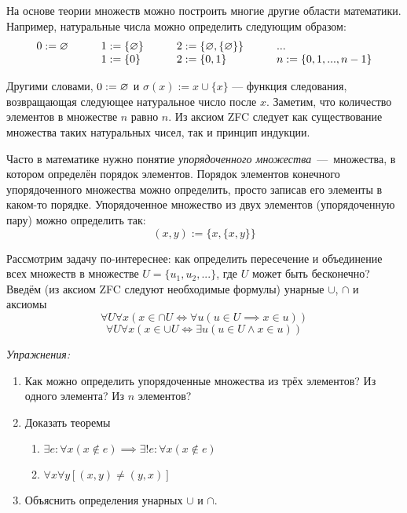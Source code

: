 На основе теории множеств можно построить многие другие области математики.
Например, натуральные числа можно определить следующим образом:
\[ \begin{array}{llll}
		0 :=\varnothing\qquad & 1  :=\{\varnothing\}\qquad & 2  :=\{\varnothing,\{\varnothing\}\}\qquad & ... \\
		                & 1:=\{0\}\qquad       & 2:=\{0,1\}
		                & n:=\{0,1,...,n-1\}
	\end{array}
\]

Другими словами, ${0:=\varnothing}$ и $\sigma(x):=x\cup \{x\}$ --- функция следования,
возвращающая следующее натуральное число после $x$. Заметим, что количество элементов
в множестве $n$ равно $n$. Из аксиом ZFC следует как существование множества таких
натуральных чисел, так и принцип индукции.

Часто в математике нужно понятие {\it упорядоченного множества}~---~множества,
в котором определён порядок элементов. Порядок элементов
конечного упорядоченного множества можно
определить, просто записав его элементы в каком-то порядке.
Упорядоченное множество из двух элементов (упорядоченную пару)
можно определить так:
\[
	(x,y):=\{x,\{x,y\}\}
\]

Рассмотрим задачу по-интереснее: как определить пересечение и объединение
всех множеств в множестве $U=\{u_1,u_2,...\}$, где $U$ может быть бесконечно?
Введём (из аксиом ZFC следуют необходимые формулы) унарные $\cup$, $\cap$
и аксиомы
\[
	\forall U\forall x(x\in \cap U\iff \forall u(u\in U\implies x\in u))
\]
\[
	\forall U\forall x(x\in \cup U\iff \exists u(u\in U\land x\in u))
\]

\vspace{1em}
{\it Упражнения:}
\begin{enumerate}
	\item{}Как можно определить упорядоченные множества из трёх элементов?
	Из одного элемента? Из $n$ элементов?

	\item{}Доказать теоремы
	\begin{enumerate}
		\item{}${\exists e:\forall x(x\notin e)\implies
					\exists!e:\forall x(x\notin e)}$ \label{ex:eset_only}
		\item{}$\forall x\forall y[(x,y)\neq (y,x)]$
	\end{enumerate}
	\item{}Объяснить определения унарных $\cup$ и $\cap$.
\end{enumerate}

\pagebreak
